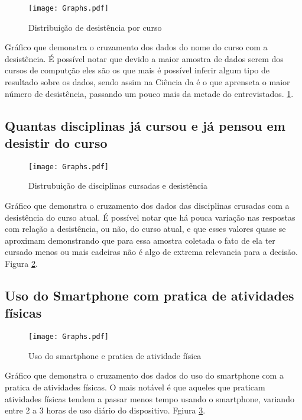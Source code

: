 \documentclass[11pt]{scrartcl} %
\begin{document}
\begin{figure}[h]
  \centering
  \texttt{[image: Graphs.pdf]}
  \label{fig:graph10}
  \caption{Distribuição de desistência por curso}
\end{figure}

Gráfico que demonstra o cruzamento dos dados do nome do curso com a desistência. É possível notar que devido a maior amostra de dados serem dos cursos de computção eles são os que mais é possível inferir algum tipo de resultado sobre os dados, sendo assim na Ciência da é o que aprenseta o maior número de desistência, passando um pouco mais da metade do entrevistados. \ref{fig:graph10}.

\clearpage

\subsection{Quantas disciplinas já cursou e já pensou em desistir do curso}

\begin{figure}[h]
  \centering
  \texttt{[image: Graphs.pdf]}
  \label{fig:graph11}
  \caption{Distrubuição de disciplinas cursadas e desistência}
\end{figure}

Gráfico que demonstra o cruzamento dos dados das disciplinas crusadas com a desistência do curso atual. É possível notar que há pouca variação nas respostas com relação a desistência, ou não, do curso atual, e que esses valores quase se aproximam demonstrando que para essa amostra coletada o fato de ela ter cursado menos ou mais cadeiras não é algo de extrema relevancia para a decisão. Figura \ref{fig:graph11}.

\clearpage

\subsection{Uso do Smartphone com pratica de atividades físicas}

\begin{figure}[h]
  \centering
  \texttt{[image: Graphs.pdf]}
  \label{fig:graph12}
  \caption{Uso do smartphone e pratica de atividade física}
\end{figure}

Gráfico que demonstra o cruzamento dos dados do uso do smartphone com a pratica de atividades físicas. O mais notável é que aqueles que praticam atividades físicas tendem a passar menos tempo usando o smartphone, variando entre 2 a 3 horas de uso diário do dispositivo. Fgiura \ref{fig:graph12}.
\end{document}

